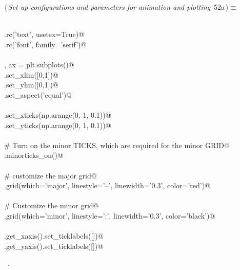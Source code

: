 \documentclass[11.5pt]{report}
\begin{document}
\begin{flushleft} \small
\begin{minipage}{\linewidth}\label{scrap83}\raggedright\small
{} $\langle\,${\itshape Set up configurations and parameters for animation and plotting}\nobreak\ {\footnotesize {52a}}$\,\rangle\equiv$
\vspace{-1ex}
\begin{list}{}{} \item
\mbox{}\verb@@\\
\mbox{}\verb@plt.rc('text', usetex=True)@\\
\mbox{}\verb@plt.rc('font', family='serif')@\\
\mbox{}\verb@@\\
\mbox{}\verb@fig, ax = plt.subplots()@\\
\mbox{}\verb@ax.set_xlim([0,1])@\\
\mbox{}\verb@ax.set_ylim([0,1])@\\
\mbox{}\verb@ax.set_aspect('equal')@\\
\mbox{}\verb@@\\
\mbox{}\verb@ax.set_xticks(np.arange(0, 1, 0.1))@\\
\mbox{}\verb@ax.set_yticks(np.arange(0, 1, 0.1))@\\
\mbox{}\verb@@\\
\mbox{}\verb@# Turn on the minor TICKS, which are required for the minor GRID@\\
\mbox{}\verb@ax.minorticks_on()@\\
\mbox{}\verb@@\\
\mbox{}\verb@# customize the major grid@\\
\mbox{}\verb@ax.grid(which='major', linestyle='--', linewidth='0.3', color='red')@\\
\mbox{}\verb@@\\
\mbox{}\verb@# Customize the minor grid@\\
\mbox{}\verb@ax.grid(which='minor', linestyle=':', linewidth='0.3', color='black')@\\
\mbox{}\verb@@\\
\mbox{}\verb@ax.get_xaxis().set_ticklabels([])@\\
\mbox{}\verb@ax.get_yaxis().set_ticklabels([])@\\
\mbox{}\verb@@{\NWsep}
\end{list}
\vspace{-1.5ex}
\footnotesize
\begin{list}{}{\setlength{\itemsep}{-\parsep}\setlength{\itemindent}{-\leftmargin}}
\item \NWtxtMacroRefIn\ .

\item{}
\end{list}
\end{minipage}\vspace{4ex}
\end{flushleft}
\end{document}
